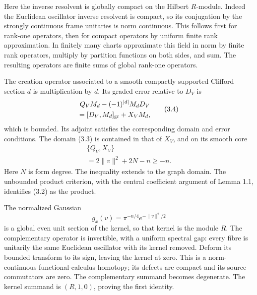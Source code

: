 \documentclass[
  11pt,
]{article}
\begin{document}
Here the inverse resolvent is globally compact on the Hilbert
\(R\)-module. Indeed the Euclidean oscillator inverse resolvent is
compact, so its conjugation by the strongly continuous frame unitaries
is norm continuous. This follows first for rank-one operators, then for
compact operators by uniform finite rank approximation. In finitely many
charts approximate this field in norm by finite rank operators, multiply
by partition functions on both sides, and sum. The resulting operators
are finite sums of global rank-one operators.

The creation operator associated to a smooth compactly supported
Clifford section \(d\) is multiplication by \(d\). Its graded error
relative to \(D_V\) is \[
\begin{gathered}
Q_V M_d-(-1)^{|d|}M_dD_V\\
 =[D_V,M_d]_{\rm gr}+X_VM_d,
\end{gathered}
\tag{3.4}
\] which is bounded. Its adjoint satisfies the corresponding domain and
error conditions. The domain (3.3) is contained in that of \(X_V\), and
on its smooth core \[
\begin{gathered}
\{Q_V,X_V\}\\
=2\|v\|^2+2N-n\geq -n.
\end{gathered}
\tag{3.5}
\] Here \(N\) is form degree. The inequality extends to the graph
domain. The unbounded product criterion, with the central coefficient
argument of Lemma 1.1, identifies (3.2) as the product.

The normalized Gaussian \[
g_x(v)=\pi^{-n/4}e^{-\|v\|^2/2}
\tag{3.6}
\] is a global even unit section of the kernel, so that kernel is the
module \(R\). The complementary operator is invertible, with a uniform
spectral gap: every fibre is unitarily the same Euclidean oscillator
with its kernel removed. Deform its bounded transform to its sign,
leaving the kernel at zero. This is a norm-continuous
functional-calculus homotopy; its defects are compact and its source
commutators are zero. The complementary summand becomes degenerate. The
kernel summand is \((R,1,0)\), proving the first identity.
\end{document}
